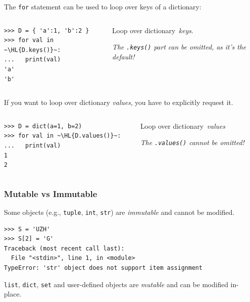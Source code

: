 \documentclass[english,serif,mathserif,xcolor=pdftex,dvipsnames,table]{beamer}
\begin{document}
\begin{frame}[fragile]
  The \texttt{for} statement can be used to loop over keys of a dictionary:
  \+
  \begin{columns}[c]
    \begin{column}{0.5\textwidth}
\begin{lstlisting}
>>> D = { 'a':1, 'b':2 }
>>> for val in ~\HL{D.keys()}~:
...   print(val)
'a'
'b'
\end{lstlisting}
    \end{column}
    \begin{column}{0.4\textwidth}
      \raggedleft
      Loop over dictionary~\emph{keys}.

      \emph{The \texttt{.keys()} part can be omitted, as it's the
        default!}
    \end{column}
  \end{columns}
\end{frame}

\begin{frame}[fragile]
  If you want to loop over dictionary \emph{values}, you have to
  explicitly request it.

  \+
  \begin{columns}[c]
    \begin{column}{0.5\textwidth}
\begin{lstlisting}
>>> D = dict(a=1, b=2)
>>> for val in ~\HL{D.values()}~:
...   print(val)
1
2
\end{lstlisting}
    \end{column}
    \begin{column}{0.4\textwidth}
      \raggedleft
      Loop over dictionary~\emph{values}

      \emph{The \texttt{.values()} cannot be omitted!}
    \end{column}
  \end{columns}
\end{frame}



\begin{frame}[fragile]
  \frametitle{Mutable vs Immutable}
  Some objects (e.g., \texttt{tuple}, \texttt{int}, \texttt{str})
  are \emph{immutable} and cannot be modified.
\begin{lstlisting}
>>> S = 'UZH'
>>> S[2] = 'G'
Traceback (most recent call last):
  File "<stdin>", line 1, in <module>
TypeError: 'str' object does not support item assignment
\end{lstlisting}


  \+
  \texttt{list}, \texttt{dict}, \texttt{set} and user-defined objects
  are \emph{mutable} and can be modified in-place.
\end{frame}
\end{document}
